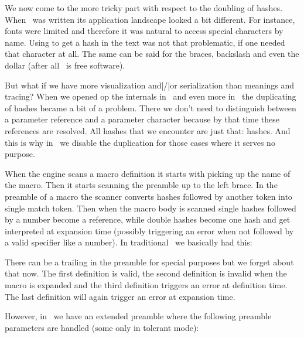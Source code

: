 We now come to the more tricky part with respect to the doubling of hashes. When
\TEX\ was written its application landscape looked a bit different. For instance,
fonts were limited and therefore it was natural to access special characters by
name. Using \type {\#} to get a hash in the text was not that problematic, if one
needed that character at all. The same can be said for the braces, backslash and
even the dollar (after all \TEX\ is free software).

But what if we have more visualization and|/|or serialization than meanings and
tracing? When we opened op the internals in \LUATEX\ and even more in
\LUAMETATEX\ the duplicating of hashes became a bit of a problem. There we don't
need to distinguish between a parameter reference and a parameter character
because by that time these references are resolved. All hashes that we encounter
are just that: hashes. And this is why in \LUAMETATEX\ we disable the duplication
for those cases where it serves no purpose.

When the engine scans a macro definition it starts with picking up the name of
the macro. Then it starts scanning the preamble up to the left brace. In the
preamble of a macro the scanner converts hashes followed by another token into
single match token. Then when the macro body is scanned single hashes followed by
a number become a reference, while double hashes become one hash and get
interpreted at expansion time (possibly triggering an error when not followed by
a valid specifier like a number). In traditional \TEX\ we basically had this:

\starttyping
\def\test#1{#1}
\def\test#1{##}
\def\test#1{#X}
\def\test#1{##1}
\stoptyping

There can be a trailing \type {#} in the preamble for special purposes but we
forget about that now. The first definition is valid, the second definition is
invalid when the macro is expanded and the third definition triggers an error at
definition time. The last definition will again trigger an error at expansion
time.

However, in \LUAMETATEX\ we have an extended preamble where the following
preamble parameters are handled (some only in tolerant mode):

